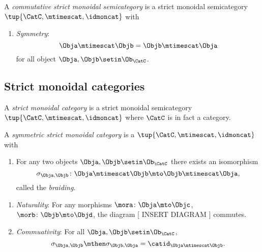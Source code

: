 \begin{ctdefinition}
    \label{def:commutative-strict-monoidal}
    A \emph{commutative strict monoidal semicategory} is a strict monoidal semicategory  $\tup{\CatC, \mtimescat, \idmoncat}$ with

    \condit

    \begin{enumerate}
        \item \emph{Symmetry}:
              \begin{equation}
                  \Obja \mtimescat \Objb = \Objb \mtimescat \Obja
              \end{equation}
              for all object $\Obja, \Objb \setin \Ob_\CatC$.
    \end{enumerate}
\end{ctdefinition}


\subsection{Strict monoidal categories}

\begin{ctdefinition}
    \label{def:strict-monoidal-category}
    A \emph{strict monoidal category} is a strict monoidal semicategory $\tup{\CatC, \mtimescat, \idmoncat}$ where $\CatC$ is in fact a category.
\end{ctdefinition}

\begin{ctdefinition}
    \label{def:sym-strict-monoidal-semicat}
    A \emph{symmetric strict monoidal category} is a  $\tup{\CatC, \mtimescat, \idmoncat}$ with

    \constit

    \begin{enumerate}
        \item For any two objects $\Obja, \Objb \setin \Ob_\CatC$ there exists an isomorphism
              \begin{equation}
                  \sigma_{\Obja, \Objb} \colon \Obja \mtimescat   \Objb \mto \Objb \mtimescat   \Obja,
              \end{equation}
              called the \emph{braiding}.
    \end{enumerate}

    \condit

    \begin{enumerate}
        \item \emph{Naturality}: For any morphisms $\mora \colon \Obja \mto \Objc$, $\morb \colon \Objb \mto \Objd$, the diagram
                  [ INSERT DIAGRAM ]
              commutes.
        \item \emph{Commuativity}: For all $\Obja, \Objb \setin \Ob_\CatC$,
              \begin{equation}
                  \sigma_{\Obja, \Objb} \mthen \sigma_{\Objb, \Obja} = \catid_{\Obja \mtimescat   \Objb}.
              \end{equation}
    \end{enumerate}

\end{ctdefinition}




